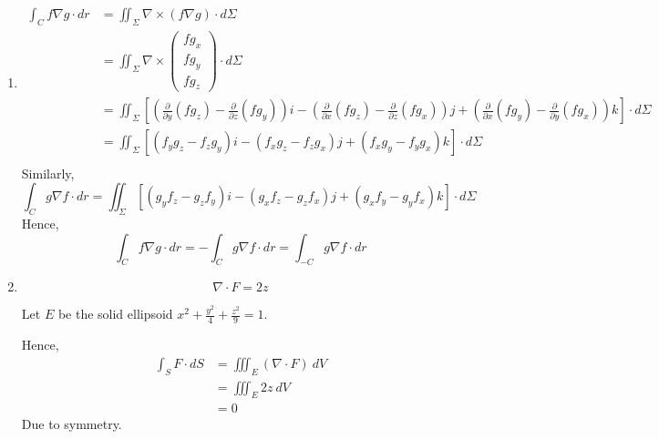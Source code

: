 \documentclass{article}
\newcommand{\p}[2]{\frac{\partial #1}{\partial #2}}
\newcommand{\paren}[1]{\left(#1\right)}
\newcommand{\brac}[1]{\left[#1\right]}
\begin{document}
\begin{enumerate}[label=(\alph*)]
\item
\begin{align*}
\int_C f\nabla g\cdot dr &= \iint_\Sigma \nabla \times (f\nabla g)\cdot d\Sigma \\
&= \iint_\Sigma \nabla \times \begin{pmatrix}
fg_x\\fg_y\\fg_z
\end{pmatrix}
\cdot d\Sigma \\
&= \iint_\Sigma \brac{\paren{\p{}{y}(fg_z)-\p{}{z}(fg_y)}i - \paren{\p{}{x}(fg_z)-\p{}{z}(fg_x)}j + \paren{\p{}{x}(fg_y)-\p{}{y}(fg_x)}k }\cdot d\Sigma \\
&= \iint_\Sigma \brac{\paren{f_yg_z-f_zg_y}i - \paren{f_xg_z-f_zg_x}j + \paren{f_xg_y-f_yg_x}k }\cdot d\Sigma \\
\end{align*}
Similarly,
\[
\int_C g\nabla f\cdot dr = \iint_\Sigma \brac{\paren{g_yf_z-g_zf_y}i - \paren{g_xf_z-g_zf_x}j + \paren{g_xf_y-g_yf_x}k }\cdot d\Sigma
\]
Hence,
\[
\int_C f\nabla g\cdot dr = -\int_C g\nabla f\cdot dr = \int_{-C} g\nabla f\cdot dr
\]

\item
\[
\nabla\cdot F = 2z
\]

Let $E$ be the solid ellipsoid $x^2+\frac{y^2}{4}+\frac{z^2}{9}=1$.

Hence,
\begin{align*}
\int_S F\cdot dS
&= \iiint_E (\nabla\cdot F)\ dV \\
&= \iiint_E 2z\ dV \\
&= 0
\end{align*}
Due to symmetry.
\end{enumerate}
\end{document}
